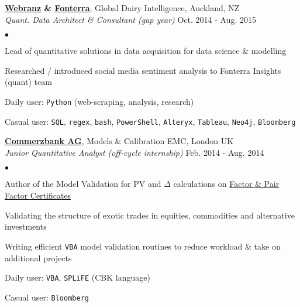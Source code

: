 \documentclass[margin, line]{res}
\newcommand{\algo}{https://twitter.com/flipdazed}
\newcommand{\Webranz}{http://webranz.com}
\newcommand{\cbkPF}{http://www2.warrants.commerzbank.com/Products/ProductSearchAdvanced.aspx?pc=228&c=2181036}
\newcommand{\cbk}{https://www.commerzbank.com/}
\newcommand{\SC}{http://www.jstor.org/discover/10.2307/2330812?uid=3738032&uid=2&uid=4&sid=21104643963563}
\newcommand{\LV}{http://en.wikipedia.org/wiki/Local_volatility}
\newcommand{\Fonterra}{https://www.fonterra.com/nz/en/About/Global+Dairy+Trade} %
\newenvironment{list2}{
	\begin{list}{$\bullet$}{%
		\setlength{\itemsep}{0in}
		\setlength{\parsep}{0in} \setlength{\parskip}{0in}
		\setlength{\topsep}{0in} \setlength{\partopsep}{0in}
		\setlength{\leftmargin}{0.2in}}}{\end{list}}
\begin{document}
\begin{resume}
{\bf \href{\Webranz}{Webranz} \& \href{\Fonterra}{Fonterra}}, 
	Global Dairy Intelligence, Auckland, NZ \\
\vspace{-.3cm}
{\em Quant. Data Architect \& Consultant (gap year)}
	\hfill{ Oct. 2014 - Aug. 2015}\\

\begin{list2}
\item Lead of quantitative solutions in data acquisition for data science \& modelling
\item Researched / introduced social media sentiment analysis to Fonterra Insights (quant) team
\item Daily user: \verb|Python| (web-scraping, analysis, research)
\item Casual user: \verb|SQL|, \verb|regex|, \verb|bash|, \verb|PowerShell|, \verb|Alteryx|, \verb|Tableau|, \verb|Neo4j|, \verb|Bloomberg|
\end{list2}

{\bf \href{\cbk}{Commerzbank AG}}, Models \& Calibration EMC, London UK \\
\vspace{-.3cm}
{\em Junior Quantitative Analyst (off-cycle internship)} 
\hfill { Feb. 2014 - Aug. 2014}\\

\begin{list2}
\item Author of the Model Validation for PV and $\Delta$ calculations on
\href{\cbkPF}{Factor \& Pair Factor Certificates}
\item Validating the structure of exotic trades in equities, commodities and alternative investments
\item Writing efficient \verb|VBA| model validation routines to reduce workload \& take on additional projects
\item Daily user: \verb|VBA|, \verb|SPLiFE| (CBK language)
\item Casual user: \verb|Bloomberg|
\end{list2}


\end{resume}
\end{document}
